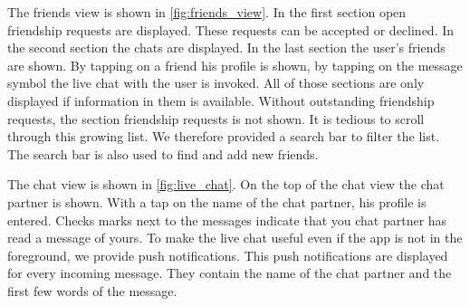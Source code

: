 \documentclass[11pt, accentcolor=tud1c]{tudreport}
\begin{document}
The friends view is shown in \autoref{fig:friends_view}. In the first section open friendship requests are displayed. These requests can be accepted or declined. In the second section the chats are displayed. In the last section the user's friends are shown. By tapping on a friend his profile is shown, by tapping on the message symbol the live chat with the user is invoked. 
All of those sections are only displayed if information in them is available. Without outstanding friendship requests, the section friendship requests is not shown. 
It is tedious to scroll through this growing list. We therefore provided a search bar to filter the list. The search bar is also used to find and add new friends. 

The chat view is shown in \autoref{fig:live_chat}. On the top of the chat view the chat partner is shown.
With a tap on the name of the chat partner, his profile is entered. Checks marks next to the messages indicate that you chat partner has read a message of yours. To make the live chat useful even if the app is not in the foreground, we provide push notifications. This push notifications are displayed for every incoming message. They contain the name of the chat partner and the first few words of the message.
\end{document}
